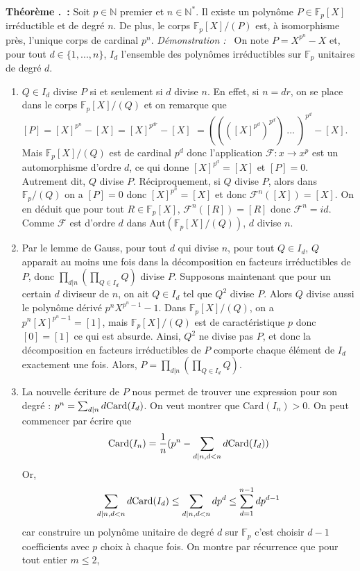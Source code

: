 \documentclass[5pt,a4paper]{article}
\newcounter{thm}[section]
\renewcommand{\thethm}{\thesection.\arabic{thm}}
\newcommand{\thm}[1]{\stepcounter{thm}\noindent\textbf{Théorème \thethm ~:} #1 \newline}
\newcommand{\demoEnum}[1]{\textit{Démonstration :~} #1}
\begin{document}
\begin{onehalfspacing}
\thm{Soit $p \in \mathbb{N}$ premier et $n \in \mathbb{N}^{*}$. Il existe un polynôme $P \in \mathbb{F}_p[X]$ irréductible et de degré $n$. De plus, le corps $\mathbb{F}_p[X]/(P)$ est, à isomorphisme près, l'unique corps de cardinal $p^n$.}
\demoEnum{On note $P = X^{p^n} - X$ et, pour tout $d \in \{1, ..., n\}$, $I_d$ l'ensemble des polynômes irréductibles sur $\mathbb{F}_p$ unitaires de degré $d$.
	\begin{enumerate}
	\item $Q \in I_d$ divise $P$ si et seulement si $d$ divise $n$. En effet, si $n = dr$, on se place dans le corps $\mathbb{F}_p[X]/(Q)$ et on remarque que $[P] = [X]^{p^n} - [X] = [X]^{p^{dr}} - [X]$ $= ((([X]^{p^d})^{p^d})~...~)^{p^d} - [X]$. Mais $\mathbb{F}_p[X]/(Q)$ est de cardinal $p^d$ donc l'application $\mathcal{F} : x \rightarrow x^p$ est un automorphisme d'ordre $d$, ce qui donne $[X]^{p^d} = [X]$ et $[P] = 0$. Autrement dit, $Q$ divise $P$. Réciproquement, si $Q$ divise $P$, alors dans $\mathbb{F}_p/(Q)$ on a $[P] = 0$ donc $[X]^{p^n} = [X]$ et donc $\mathcal{F}^n([X]) = [X]$. On en déduit que pour tout $R \in \mathbb{F}_p[X]$, $\mathcal{F}^n([R]) = [R]$ donc $\mathcal{F}^n = id$. Comme $\mathcal{F}$ est d'ordre $d$ dans Aut$(\mathbb{F}_p[X]/(Q))$, $d$ divise $n$.
	\item Par le lemme de Gauss, pour tout $d$ qui divise $n$, pour tout $Q \in I_d$, $Q$ apparait au moins une fois dans la décomposition en facteurs irréductibles de $P$, donc  $\prod_{d|n}(\prod_{Q \in I_d}Q)$ divise $P$. Supposons maintenant que pour un certain $d$ diviseur de $n$, on ait $Q \in I_d$ tel que $Q^2$ divise $P$. Alors $Q$ divise aussi le polynôme dérivé $p^nX^{p^n - 1} - 1$. Dans $\mathbb{F}_p[X]/(Q)$, on a $p^n[X]^{p^n - 1} = [1]$, mais $\mathbb{F}_p[X]/(Q)$ est de caractéristique $p$ donc $[0] = [1]$ ce qui est absurde. Ainsi, $Q^2$ ne divise pas $P$, et donc la décomposition en facteurs irréductibles de $P$ comporte chaque élément de $I_d$ exactement une fois. Alors, $P = \prod_{d|n}(\prod_{Q \in I_d}Q)$.
	\item La nouvelle écriture de $P$ nous permet de trouver une expression pour son degré : $p^n = \sum_{d|n}d\textup{Card}(I_d)$. On veut montrer que Card$(I_n) > 0$. On peut commencer par écrire que 
\[\textup{Card}(I_n) = \frac{1}{n}(p^n - \sum_{d|n, d < n}d\textup{Card}(I_d))\]
Or,
\[\sum_{d|n, d < n}d\textup{Card}(I_d) \leq \sum_{d|n, d < n}dp^d \leq \sum_{d=1}^{n-1}dp^{d-1}\]
car construire un polynôme unitaire de degré $d$ sur $\mathbb{F}_p$ c'est choisir $d-1$ coefficients avec $p$ choix à chaque fois. On montre par récurrence que pour tout entier $m \leq 2$,

\end{enumerate}}
\end{onehalfspacing}
\end{document}
